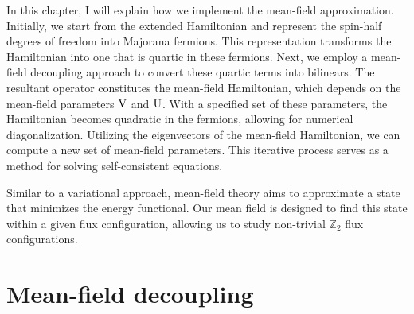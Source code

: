 

In this chapter, I will explain how we implement the mean-field approximation. Initially, we start from the extended Hamiltonian and represent the spin-half degrees of freedom into Majorana fermions. This representation transforms the Hamiltonian into one that is quartic in these fermions. Next, we employ a mean-field decoupling approach to convert these quartic terms into bilinears. The resultant operator constitutes the mean-field Hamiltonian, which depends on the mean-field parameters $\mathrm{V}$ and $\mathrm{U}$. With a specified set of these parameters, the Hamiltonian becomes quadratic in the fermions, allowing for numerical diagonalization. Utilizing the eigenvectors of the mean-field Hamiltonian, we can compute a new set of mean-field parameters. This iterative process serves as a method for solving self-consistent equations.

Similar to a variational approach, mean-field theory aims to approximate a state that minimizes the energy functional.  Our mean field is designed to find this state within a given flux configuration, allowing us to study non-trivial $\mathbb{Z}_2$ flux configurations.






\section{Mean-field decoupling}

